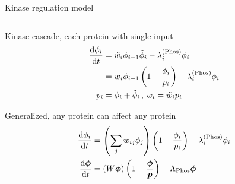 
\begin{frame}{Kinase regulation model}
\label{sec:Heinrich}

\begin{columns}
\begin{column}{0.5\textwidth}



Kinase cascade, each protein with single input~\cite{Heinrich2002kinase}
\begin{subequations}
\label{eq:kinase_cascade}
\begin{align}
\dv{\phi_i}{t} &=
    \tilde{w}_i \phi_{i-1} \tilde{\phi}_i - \lambda_i^{(\text{Phos})} \phi_i
\\
    &=
    w_i \phi_{i-1} \left(1 - \frac{\phi_i}{p_i}\right) - \lambda_i^{(\text{Phos})} \phi_i
\\
p_i &= \phi_i + \tilde{\phi}_i
\,,\,
w_i = \tilde{w}_i p_i
\end{align}
\end{subequations}



Generalized, any protein can affect any protein
\begin{subequations}
\label{eq:kinase_general}
\begin{align}
\dv{\phi_i}{t} &=
    \left( \sum_j w_{ij} \phi_j \right) \left(1 - \frac{\phi_i}{p_i}\right) - \lambda_i^{(\text{Phos})} \phi_i
\\
\label{eq:matrix_kinase}
\dv{\boldsymbol{\phi}}{t} &= (W \boldsymbol{\phi}) \left(1 - \frac{\boldsymbol{\phi}}{\boldsymbol{p}}\right) - \Lambda_\text{Phos} \boldsymbol{\phi}
\end{align}
\end{subequations}


\end{column}
\end{columns}
\end{frame}
